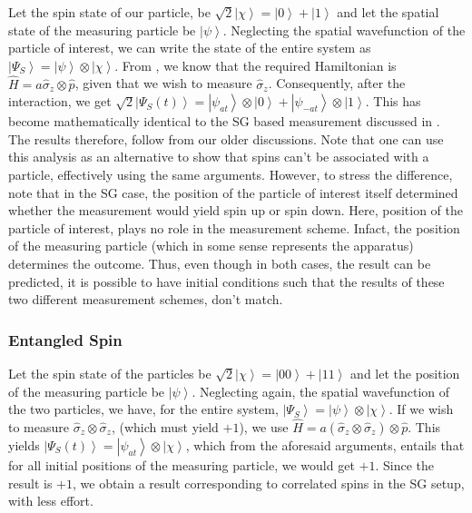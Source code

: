 Let the spin state of our particle, be $\sqrt{2}\left|\chi\right\rangle =\left|0\right\rangle +\left|1\right\rangle $
and let the spatial state of the measuring particle be $\left|\psi\right\rangle $.
Neglecting the spatial wavefunction of the particle of interest, we
can write the state of the entire system as $\left|\Psi_{S}\right\rangle =\left|\psi\right\rangle \otimes\left|\chi\right\rangle $.
From , we know that the required
Hamiltonian is $\hat{H}=a\hat{\sigma}_{z}\otimes\hat{p}$, given that
we wish to measure $\hat{\sigma}_{z}$. Consequently, after the interaction,
we get $\sqrt{2}\left|\Psi_{S}(t)\right\rangle =\left|\psi_{at}\right\rangle \otimes\left|0\right\rangle +\left|\psi_{-at}\right\rangle \otimes\left|1\right\rangle $.
This has become mathematically identical to the SG based measurement
discussed in . The results
therefore, follow from our older discussions. Note that one can use
this analysis as an alternative to show that spins can't be associated
with a particle, effectively using the same arguments. However, to
stress the difference, note that in the SG case, the position of the
particle of interest itself determined whether the measurement would
yield spin up or spin down. Here, position of the particle of interest,
plays no role in the measurement scheme. Infact, the position of the
measuring particle (which in some sense represents the apparatus)
determines the outcome. Thus, even though in both cases, the result
can be predicted, it is possible to have initial conditions such that
the results of these two different measurement schemes, don't match.


\subsubsection{Entangled Spin }

Let the spin state of the particles be $\sqrt{2}\left|\chi\right\rangle =\left|00\right\rangle +\left|11\right\rangle $
and let the position of the measuring particle be $\left|\psi\right\rangle $.
Neglecting again, the spatial wavefunction of the two particles, we
have, for the entire system, $\left|\Psi_{S}\right\rangle =\left|\psi\right\rangle \otimes\left|\chi\right\rangle $.
If we wish to measure $\hat{\sigma}_{z}\otimes\hat{\sigma}_{z}$,
(which must yield $+1$), we use $\hat{H}=a(\hat{\sigma}_{z}\otimes\hat{\sigma}_{z})\otimes\hat{p}$.
This yields $\left|\Psi_{S}(t)\right\rangle =\left|\psi_{at}\right\rangle \otimes\left|\chi\right\rangle $,
which from the aforesaid arguments, entails that for all initial positions
of the measuring particle, we would get $+1$. Since the result is
$+1$, we obtain a result corresponding to correlated spins in the
SG setup, with less effort.


